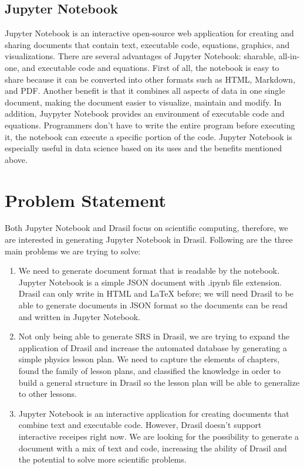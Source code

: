 \subsection{Jupyter Notebook}
Jupyter Notebook is an interactive open-source web application for creating and 
sharing documents that contain text, executable code, equations, graphics, and 
visualizations. 
There are several advantages of Jupyter Notebook: sharable, all-in-one, and 
executable code and equations. First of all, the notebook is easy to share 
because it can be converted into other formats 
such as HTML, Markdown, and PDF. Another benefit is that 
it combines all aspects of data in one single document, making the document 
easier to visualize, maintain and modify. In addition, Juypyter Notebook 
provides an environment of executable code and equations. Programmers don't 
have to write the entire program before executing it, the notebook can execute 
a specific portion of the code. Jupyter Notebook is especially useful in data 
science based on its uses and the benefits mentioned above.

\section{Problem Statement}
Both Jupyter Notebook and Drasil focus on scientific computing, therefore, we 
are interested in generating Jupyter Notebook in Drasil. Following are the 
three main problems we are trying to solve:
\begin{enumerate}
	\item We need to generate document format that is readable by the 
	notebook. Jupyter Notebook is a simple JSON document with .ipynb file 
	extension. Drasil can only write in HTML and LaTeX before; we will
	need Drasil to be able to generate documents in JSON format so the 
	documents can be read and written in Jupyter Notebook.
	\item Not only being able to generate SRS in Drasil, we are trying to 
	expand the application of Drasil and increase the automated database by 
	generating a simple physics lesson plan. We need to capture the elements of 
	chapters, found the family of lesson plans, and classified the 
	knowledge in order to build a general structure in Drasil so the lesson 
	plan will be able to generalize to other lessons. 
	\item Jupyter Notebook is an interactive application for creating documents 
	that combine text and executable code. However, Drasil doesn't support 
	interactive receipes right now. We are looking for the possibility to 
	generate a document with a mix of text and code, increasing the ability of 
	Drasil and the potential to solve more scientific problems.
\end{enumerate}

